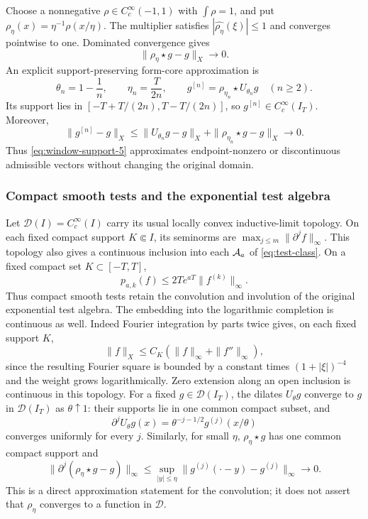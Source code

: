 Choose a nonnegative $\rho\in C_c^\infty(-1,1)$ with
$\int\rho=1$, and put $\rho_\eta(x)=\eta^{-1}\rho(x/\eta)$.
The multiplier satisfies $|\widehat{\rho_\eta}(\xi)|\le1$ and
converges pointwise to one.  Dominated convergence gives
\[
 \|\rho_\eta\star g-g\|_X\longrightarrow0.
\]
An explicit support-preserving form-core approximation is
\begin{equation}
 \theta_n=1-\frac1n,\qquad \eta_n=\frac{T}{2n},\qquad
 g^{[n]}=\rho_{\eta_n}\star U_{\theta_n}g\quad(n\ge2).
 \label{eq:window-support-5}
\end{equation}
Its support lies in
$[-T+T/(2n),T-T/(2n)]$, so $g^{[n]}\in C_c^\infty(I_T)$.
Moreover,
\[
 \|g^{[n]}-g\|_X
 \le\|U_{\theta_n}g-g\|_X
      +\|\rho_{\eta_n}\star g-g\|_X\longrightarrow0.
\]
Thus \eqref{eq:window-support-5} approximates endpoint-nonzero or discontinuous
admissible vectors without changing the original domain.

\subsubsection{Compact smooth tests and the exponential test algebra}

Let $\mathcal D(I)=C_c^\infty(I)$ carry its usual locally
convex inductive-limit topology.  On each fixed compact support
$K\Subset I$, its seminorms are
$\max_{j\le m}\|\partial^j f\|_\infty$.
This topology also gives a continuous inclusion into each
$\mathcal A_a$ of \eqref{eq:test-class}.  On a fixed compact set
$K\subset[-T,T]$,
\[
 p_{a,k}(f)\le 2T e^{aT}\|f^{(k)}\|_\infty.
\]
Thus compact smooth tests retain the convolution and involution of
the original exponential test algebra.  The embedding into the
logarithmic completion is continuous as well.
Indeed Fourier integration by parts twice gives, on each fixed
support $K$,
\[
 \|f\|_X\le C_K(\|f\|_\infty+\|f''\|_\infty),
\]
since the resulting Fourier square is bounded by a constant
times $(1+|\xi|)^{-4}$ and the weight grows logarithmically.
Zero extension along an open inclusion is continuous in this
topology.  For a fixed $g\in\mathcal D(I_T)$, the dilates
$U_\theta g$ converge to $g$ in $\mathcal D(I_T)$ as
$\theta\uparrow1$: their supports lie in one common compact
subset, and
\[
 \partial^jU_\theta g(x)
 =\theta^{-j-1/2}g^{(j)}(x/\theta)
\]
converges uniformly for every $j$.  Similarly, for small
$\eta$, $\rho_\eta\star g$ has one common compact support and
\begin{equation}
 \|\partial^j(\rho_\eta\star g-g)\|_\infty
 \le\sup_{|y|\le\eta}
         \|g^{(j)}(\cdot-y)-g^{(j)}\|_\infty\longrightarrow0.
 \label{eq:window-support-6}
\end{equation}
This is a direct approximation statement for the convolution;
it does not assert that $\rho_\eta$ converges to a function in
$\mathcal D$.

